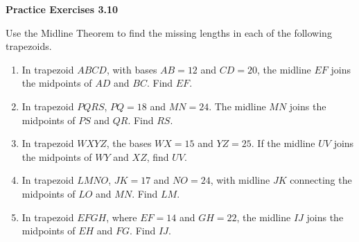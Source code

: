 \vspace{0.3ex}
\noindent\textbf{Practice Exercises 3.10}

\vspace{0.2ex}

Use the Midline Theorem to find the missing lengths in each of the following trapezoids.
\begin{enumerate}[label=\color{blue}\arabic*.]
    \item In trapezoid \(ABCD\), with bases \(AB = 12\) and \(CD = 20\), the midline \(EF\) joins the midpoints of \(AD\) and \(BC\). Find \(EF\).
    \item In trapezoid \(PQRS\), \(PQ = 18\) and \(MN = 24\). The midline \(MN\) joins the midpoints of \(PS\) and \(QR\). Find \(RS\).
    \item In trapezoid \(WXYZ\), the bases \(WX = 15\) and \(YZ = 25\). If the midline \(UV\) joins the midpoints of \(WY\) and \(XZ\), find \(UV\).
    \item In trapezoid \(LMNO\), \(JK = 17\) and \(NO = 24\), with midline \(JK\) connecting the midpoints of \(LO\) and \(MN\). Find \(LM\).
    \item In trapezoid \(EFGH\), where \(EF = 14\) and \(GH = 22\), the midline \(IJ\) joins the midpoints of \(EH\) and \(FG\). Find \(IJ\).
\end{enumerate}
